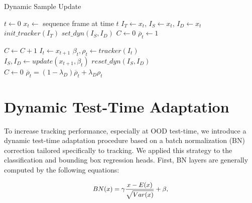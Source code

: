 \begin{algorithm}
  \centering
  \caption{Dynamic Sample Update}\label{alg:dynamic_update}
  \begin{algorithmic}
    \State $t \gets 0$
    \State $x_t \gets $ sequence frame at time $t$
    \State $I_T \gets x_t$, $I_S \gets x_t$, $I_D \gets x_t$
    \State $init\_tracker(I_T)$ 
    \State $set\_dyn(I_S, I_D)$ 
    \State $C \gets 0$ 
    \State $\overline{\rho}_t \gets 1$ 
  
      \State $C \gets C+1$ 
      \State $I_t \gets x_{t+1}$  
      \State ${\beta}_t, {\rho}_t \gets tracker(I_t)$ 
      \State {}
        \\ 
            \State $I_S, I_D \gets update(x_{t+1}, {\beta}_t)$ %
            \State $reset\_dyn(I_S, I_D)$ \\ 
            \State $C \gets 0$
      \EndIf 
      \State $\overline{\rho }_t = (1-{\lambda}_{D}) \overline{\rho}_{t} +  {\lambda}_{D} {\rho}_t$ \\ 
      \EndWhile
  \end{algorithmic}
\end{algorithm}


\section{Dynamic Test-Time Adaptation} \label{sec:methods_tta}

To increase tracking performance, especially at OOD test-time, we introduce a dynamic test-time adaptation procedure based on a batch normalization (BN) correction tailored specifically to tracking. We applied this strategy to the classification and bounding box regression heads. First, BN layers are generally computed by the following equations:


\begin{equation}\small
    \centering
    \label{eq:bn}
        \begin{aligned}  
        BN(x) = \gamma \frac{x - E(x)}{\sqrt{Var(x)}} +  \beta ,
        \end{aligned}
\end{equation}
  
